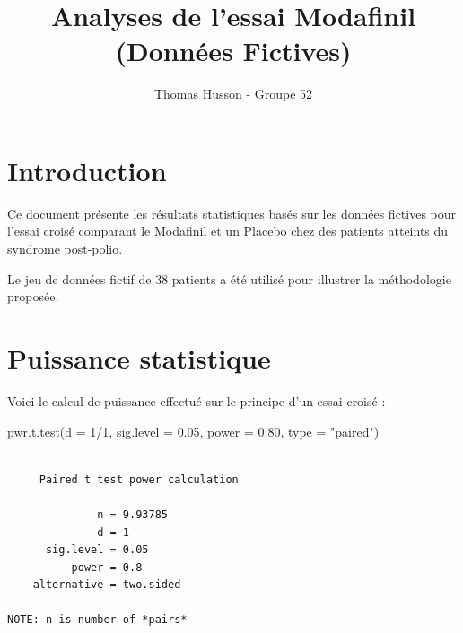 \documentclass[
  letterpaper,
  DIV=11,
  numbers=noendperiod]{scrartcl}
\title{Analyses de l'essai Modafinil (Données Fictives)}
\author{Thomas Husson - Groupe 52}
\date{}
\newenvironment{Shaded}{\begin{snugshade}}{\end{snugshade}}
\newcommand{\AttributeTok}[1]{\textcolor[rgb]{0.40,0.45,0.13}{#1}}
\newcommand{\DecValTok}[1]{\textcolor[rgb]{0.68,0.00,0.00}{#1}}
\newcommand{\FloatTok}[1]{\textcolor[rgb]{0.68,0.00,0.00}{#1}}
\newcommand{\FunctionTok}[1]{\textcolor[rgb]{0.28,0.35,0.67}{#1}}
\newcommand{\NormalTok}[1]{\textcolor[rgb]{0.00,0.23,0.31}{#1}}
\newcommand{\SpecialCharTok}[1]{\textcolor[rgb]{0.37,0.37,0.37}{#1}}
\newcommand{\StringTok}[1]{\textcolor[rgb]{0.13,0.47,0.30}{#1}}
\renewcommand*\contentsname{Table of contents}
\newcommand\contentsname{Table of contents}
\begin{document}
\maketitle

\renewcommand*\contentsname{Table of contents}
{
\hypersetup{linkcolor=}
\setcounter{tocdepth}{3}
\tableofcontents
}

\section{Introduction}\label{introduction}

Ce document présente les résultats statistiques basés sur les données
fictives pour l'essai croisé comparant le Modafinil et un Placebo chez
des patients atteints du syndrome post-polio.

Le jeu de données fictif de 38 patients a été utilisé pour illustrer la
méthodologie proposée.

\section{Puissance statistique}\label{puissance-statistique}

Voici le calcul de puissance effectué sur le principe d'un essai croisé
:

\begin{Shaded}
\begin{Highlighting}[]
\FunctionTok{pwr.t.test}\NormalTok{(}\AttributeTok{d =} \DecValTok{1}\SpecialCharTok{/}\DecValTok{1}\NormalTok{, }\AttributeTok{sig.level =} \FloatTok{0.05}\NormalTok{, }\AttributeTok{power =} \FloatTok{0.80}\NormalTok{, }\AttributeTok{type =} \StringTok{"paired"}\NormalTok{)}
\end{Highlighting}
\end{Shaded}

\begin{verbatim}

     Paired t test power calculation 

              n = 9.93785
              d = 1
      sig.level = 0.05
          power = 0.8
    alternative = two.sided

NOTE: n is number of *pairs*
\end{verbatim}
\end{document}
